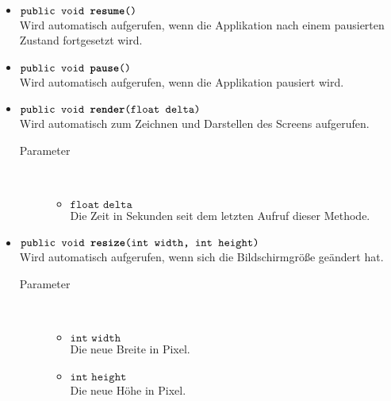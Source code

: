 \begin{description}
\begin{itemize}
		\item $\texttt{public void \textbf{resume}()}$ \\ Wird automatisch aufgerufen, wenn die Applikation nach einem pausierten Zustand fortgesetzt wird.	
	
		\item $\texttt{public void \textbf{pause}()}$ \\ Wird automatisch aufgerufen, wenn die Applikation pausiert wird.
	
		\item $\texttt{public void \textbf{render}(float delta)}$ \\ Wird automatisch zum Zeichnen und Darstellen des Screens aufgerufen.
		\begin{description}
			\item[Parameter] \hfill \\
			\vspace{-.8cm}
			\begin{itemize}
				\item $\texttt{float delta}$ \\ Die Zeit in Sekunden seit dem letzten Aufruf dieser Methode.
			\end{itemize}
		\end{description}	
	
		\item $\texttt{public void \textbf{resize}(int width, int height)}$ \\ Wird automatisch aufgerufen, wenn sich die Bildschirmgröße geändert hat.
		\begin{description}
			\item[Parameter] \hfill \\
			\vspace{-.8cm}
			\begin{itemize}
				\item $\texttt{int width}$ \\ Die neue Breite in Pixel.
				\item $\texttt{int height}$ \\ Die neue Höhe in Pixel.
			\end{itemize}
		\end{description}
	\end{itemize}
\end{description}